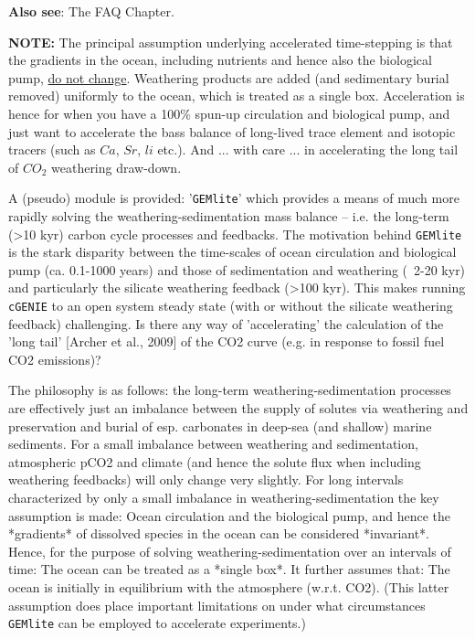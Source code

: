 \noindent \textbf{Also see}: The FAQ Chapter.

\vspace{1mm}
\noindent \textbf{NOTE:} The principal assumption underlying accelerated time-stepping is that the gradients in the ocean, including nutrients and hence also the biological pump, \uline{do not change}. Weathering products are added (and sedimentary burial removed) uniformly to the ocean, which is treated as a single box. Acceleration is hence for when you have a 100\% spun-up circulation and biological pump, and just want to accelerate the bass balance of long-lived trace element and isotopic tracers (such as \(Ca\), \(Sr\), \(li\) etc.). And ... with care ... in accelerating the long tail of \(CO_{2}\) weathering draw-down.

\vspace{2mm}

\noindent A (pseudo) module is provided: '\texttt{GEMlite}' which provides a means of much more rapidly solving the weathering-sedimentation mass balance -- i.e. the long-term (>10 kyr) carbon cycle processes and feedbacks. The motivation behind \texttt{GEMlite} is the stark disparity between the time-scales of ocean circulation and biological pump (ca. 0.1-1000 years) and those of sedimentation and weathering (~2-20 kyr) and particularly the silicate weathering feedback (>100 kyr). This makes running \texttt{cGENIE} to an open system steady state (with or without the silicate weathering feedback) challenging. Is there any way of 'accelerating' the calculation of the 'long tail' [Archer et al., 2009] of the CO2 curve (e.g. in response to fossil fuel CO2 emissions)?

The philosophy is as follows: the long-term weathering-sedimentation processes are effectively just an imbalance between the supply of solutes via weathering and preservation and burial of esp. carbonates in deep-sea (and shallow) marine sediments. For a small imbalance between weathering and sedimentation, atmospheric pCO2 and climate (and hence the solute flux when including weathering feedbacks) will only change very slightly. For long intervals characterized by only a small imbalance in weathering-sedimentation the key assumption is made:
Ocean circulation and the biological pump, and hence the *gradients* of dissolved species in the ocean can be considered *invariant*.
Hence, for the purpose of solving weathering-sedimentation over an intervals of time:
The ocean can be treated as a *single box*.
It further assumes that:
The ocean is initially in equilibrium with the atmosphere (w.r.t. CO2).
(This latter assumption does place important limitations on under what circumstances \texttt{GEMlite} can be employed to accelerate experiments.)

